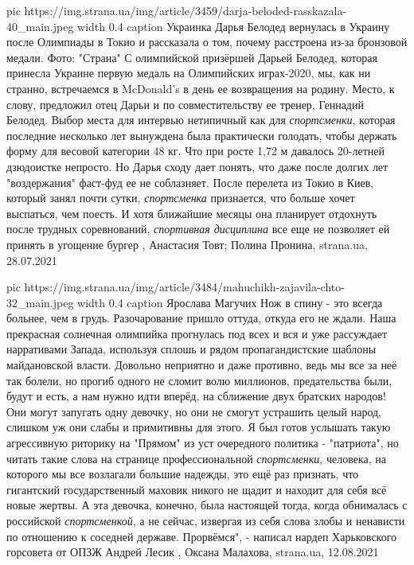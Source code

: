 \ifcmt
  pic https://img.strana.ua/img/article/3459/darja-beloded-rasskazala-40_main.jpeg
  width 0.4
	caption Украинка Дарья Белодед вернулась в Украину после Олимпиады в Токио и рассказала о том, почему расстроена из-за бронзовой медали. Фото: "Страна"
\fi
С олимпийской призёршей Дарьей Белодед, которая принесла Украине первую медаль
на Олимпийских играх-2020, мы, как ни странно, встречаемся в McDonald's в день
ее возвращения на родину. Место, к слову, предложил отец Дарьи и по
совместительству ее тренер, Геннадий Белодед.  Выбор места для интервью
нетипичный как для \emph{спортсменки}, которая последние несколько лет вынуждена была
практически голодать, чтобы держать форму для весовой категории 48 кг. Что при
росте 1,72 м давалось 20-летней дзюдоистке непросто.  Но Дарья сходу дает
понять, что даже после долгих лет "воздержания" фаст-фуд ее не соблазняет.
После перелета из Токио в Киев, который занял почти сутки, \emph{спортсменка}
признается, что больше хочет выспаться, чем поесть. И хотя ближайшие месяцы она
планирует отдохнуть после трудных соревнований, \emph{спортивная дисциплина} все еще
не позволяет ей принять в угощение бургер
, 
Анастасия Товт; Полина Пронина, strana.ua, 28.07.2021

\ifcmt
  pic https://img.strana.ua/img/article/3484/mahuchikh-zajavila-chto-32_main.jpeg
  width 0.4
	caption Ярослава Магучих
\fi
Нож в спину - это всегда больнее, чем в грудь. Разочарование пришло оттуда,
откуда его не ждали. Наша прекрасная солнечная олимпийка прогнулась под всех и
вся и уже рассуждает нарративами Запада, используя сплошь и рядом
пропагандистские шаблоны майдановской власти. Довольно неприятно и даже
противно, ведь мы все за неё так болели, но прогиб одного не сломит волю
миллионов, предательства были, будут и есть, а нам нужно идти вперёд, на
сближение двух братских народов! Они могут запугать одну девочку, но они не
смогут устрашить целый народ, слишком уж они слабы и примитивны для этого.  Я
был готов услышать такую агрессивную риторику на "Прямом" из уст очередного
политика - "патриота", но читать такие слова на странице профессиональной
\emph{спортсменки}, человека, на которого мы все возлагали большие надежды, это ещё
раз признать, что гигантский государственный маховик никого не щадит и находит
для себя всё новые жертвы. А эта девочка, конечно, была настоящей тогда, когда
обнималась с российской \emph{спортсменкой}, а не сейчас, извергая из себя слова злобы
и ненависти по отношению к соседней державе. Прорвёмся", - написал нардеп
Харьковского горсовета от ОПЗЖ Андрей Лесик
, 
Оксана Малахова, strana.ua, 12.08.2021

